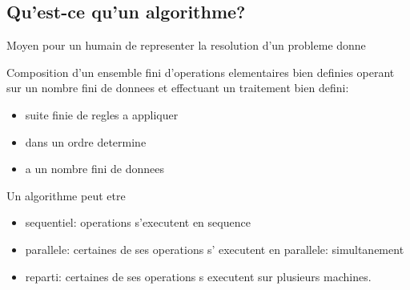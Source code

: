 \documentclass[../main.tex]{subfiles}
\begin{document}
\subsection{Qu'est-ce qu'un algorithme?}
Moyen pour un humain de representer la resolution d'un probleme donne\\
\begin{defn}[Algorithme]
	Composition d'un ensemble fini d'operations elementaires bien definies operant sur un nombre fini de donnees et effectuant un traitement bien defini:
	\begin{itemize}
		\item suite finie de regles a appliquer\\
		\item dans un ordre determine\\
		\item a un nombre fini de donnees
\end{itemize}
Un algorithme peut etre
\begin{itemize}
	\item sequentiel: operations s'executent en sequence\\
	\item parallele: certaines de ses operations s' executent en parallele: simultanement\\
	\item reparti: certaines de ses operations s executent sur plusieurs machines.
\end{itemize}
\end{defn}
\end{document}
